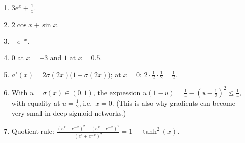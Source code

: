 \begin{enumerate}[label=\textbf{\ansnum.\arabic*}]
  \item $3e^x+\frac1x$.
  \item $2\cos x+\sin x$.
  \item $-e^{-x}$.
  \item $0$ at $x=-3$ and $1$ at $x=0.5$.
  \item $a'(x)=2\sigma(2x)\bigl(1-\sigma(2x)\bigr)$; at $x=0$: $2\cdot\frac12\cdot\frac12=\frac12$.
  \item With $u=\sigma(x)\in(0,1)$, the expression $u(1-u)=\frac14-(u-\frac12)^2\le\frac14$, with equality at $u=\frac12$, i.e.\ $x=0$. (This is also why gradients can become very small in deep sigmoid networks.)
  \item[\textbf{\ansnum.7}] Quotient rule: $\frac{(e^x+e^{-x})^2-(e^x-e^{-x})^2}{(e^x+e^{-x})^2}=1-\tanh^2(x)$.
\end{enumerate}
